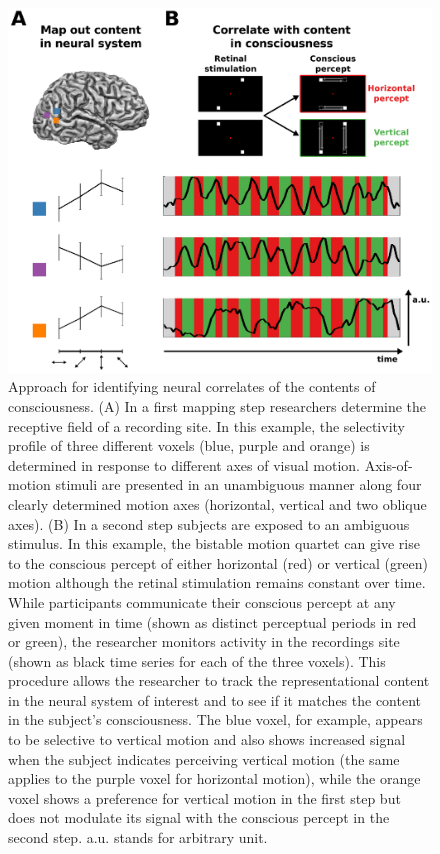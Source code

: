 \begin{figure}[!htbp]
\centering
\includegraphics[width=1.0\textwidth]{figures/chapter_01/fig1.eps}
\caption{Approach for identifying neural correlates of the contents of consciousness. (A) In a first mapping step researchers determine the receptive field of a recording site. In this example, the selectivity profile of three different voxels (blue, purple and orange) is determined in response to different axes of visual motion. Axis-of-motion stimuli are presented in an unambiguous manner along four clearly determined motion axes (horizontal, vertical and two oblique axes). (B) In a second step subjects are exposed to an ambiguous stimulus. In this example, the bistable motion quartet can give rise to the conscious percept of either horizontal (red) or vertical (green) motion although the retinal stimulation remains constant over time. While participants communicate their conscious percept at any given moment in time  (shown as distinct perceptual periods in red or green), the researcher monitors activity in the recordings site (shown as black time series for each of the three voxels). This procedure allows the researcher to track the representational content in the neural system of interest and to see if it matches the content in the subject's consciousness. The blue voxel, for example, appears to be selective to vertical motion and also shows increased signal when the subject indicates perceiving vertical motion (the same applies to the purple voxel for horizontal motion), while the orange voxel shows a preference for vertical motion in the first step but does not modulate its signal with the conscious percept in the second step. a.u. stands for arbitrary unit.}
\label{fig:ncc} 
\end{figure}

